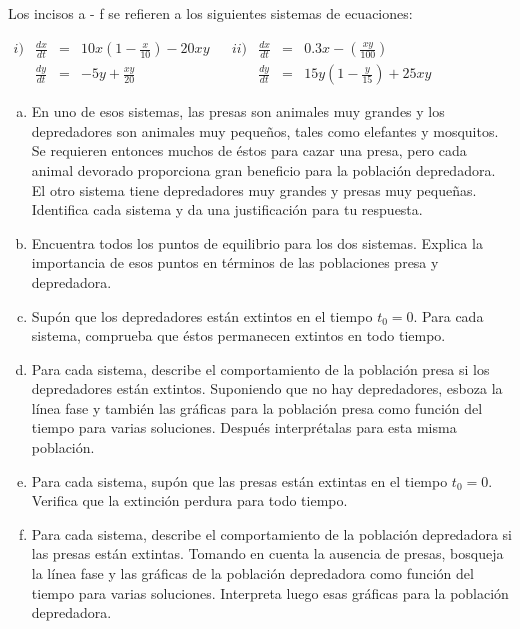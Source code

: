 \documentclass[12pt]{exam}
\begin{document}
    
    \begin{questions}
     \question%
     Los incisos a - f se refieren a los siguientes sistemas de ecuaciones:
     
     $
     \begin{array}{lrclclrcl}
        i)&\frac{dx}{dt}& = & 10x\left(1-\frac{x}{10}\right)-20xy& &ii)& \frac{dx}{dt} & = & 0.3x-\left(\frac{xy}{100}\right)\\
        & \frac{dy}{dt} & = & -5y+\frac{xy}{20} & & &\frac{dy}{dt}& = & 15y\left(1-\frac{y}{15}\right)+25xy
     \end{array}
     $
     \begin{enumerate}[a)]
         \item En uno de esos sistemas, las presas son animales muy grandes y los depredadores son animales muy pequeños, tales como elefantes y mosquitos. Se requieren entonces muchos de éstos para cazar una presa, pero cada animal devorado proporciona gran beneficio para la población depredadora. El otro sistema tiene depredadores muy grandes y presas muy pequeñas. Identifica cada sistema y da una justificación para tu respuesta.
         \item Encuentra todos los puntos de equilibrio para los dos sistemas. Explica la importancia de esos puntos en términos de las poblaciones presa y depredadora.
         \item Supón que los depredadores están extintos en el tiempo $t_0=0$. Para cada sistema, comprueba que éstos permanecen extintos en todo tiempo.
         \item Para cada sistema, describe el comportamiento de la población presa si los depredadores están extintos. Suponiendo que no hay depredadores, esboza la línea fase y también las gráficas para la población presa como función del tiempo para varias soluciones. Después interprétalas para esta misma población.
         \item Para cada sistema, supón que las presas están extintas en el tiempo  $t_0=0$. Verifica que la extinción perdura para todo tiempo.
         \item Para cada sistema, describe el comportamiento de la población depredadora si las presas están extintas. Tomando en cuenta la ausencia de presas, bosqueja la línea fase y las gráficas de la población depredadora como función del tiempo para varias soluciones. Interpreta luego esas gráficas para la población depredadora.
     \end{enumerate}



\end{questions}
\end{document}
